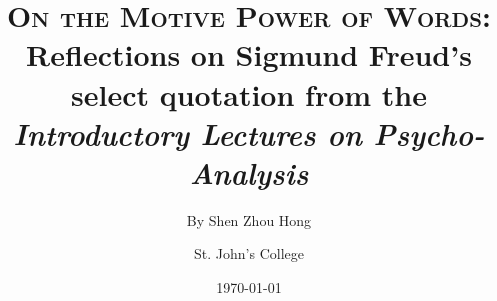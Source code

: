 \documentclass[
  12pt,       %
  a4paper,    %
  final,      %
  onecolumn,  %
  oneside,    %
  notitlepage %
]{article}
\title{
  \textbf{\textsc{On the Motive Power of Words}}: \\ Reflections on Sigmund Freud's select quotation from the \emph{Introductory Lectures on Psycho-Analysis}
}
\author{
  By Shen Zhou Hong \and St. John's College
}
\date{\today}
\begin{document}
\maketitle

% 


\nocite{*}

%
\end{document}
